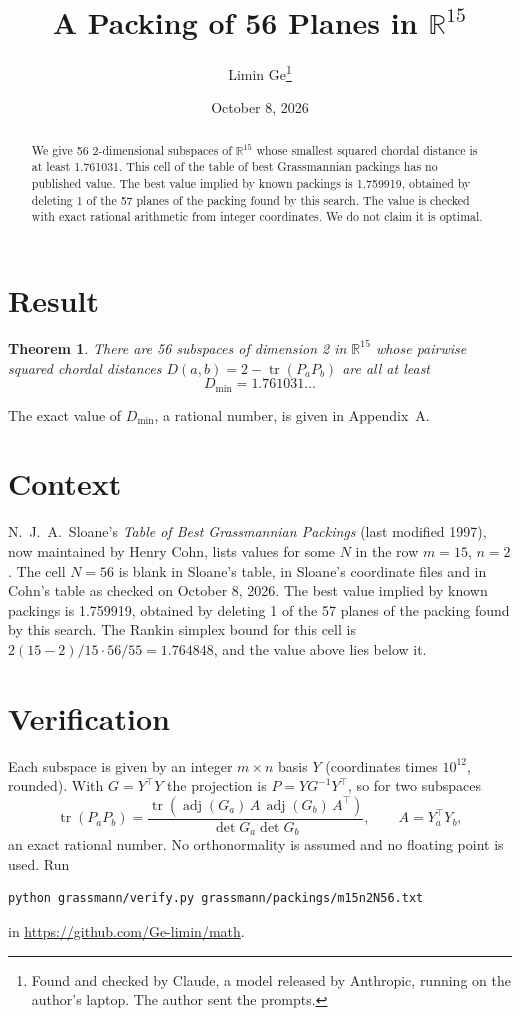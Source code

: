 \documentclass[11pt,a4paper]{article}
\title{A Packing of 56 Planes in $\mathbb{R}^{15}$}
\author{Limin Ge\thanks{Found and checked by Claude, a model released by Anthropic, running on the author's laptop. The author sent the prompts.}}
\date{October 8, 2026}
\newtheorem*{theorem}{Theorem}
\begin{document}
\maketitle
\begin{abstract}
We give 56 2-dimensional subspaces of $\mathbb{R}^{15}$ whose smallest squared chordal distance is at least 1.761031. This cell of the table of best Grassmannian packings has no published value. The best value implied by known packings is 1.759919, obtained by deleting 1 of the 57 planes of the packing found by this search. The value is checked with exact rational arithmetic from integer coordinates. We do not claim it is optimal.
\end{abstract}

\section{Result}
\begin{theorem}
There are 56 subspaces of dimension 2 in $\mathbb{R}^{15}$ whose pairwise squared chordal distances $D(a,b) = 2 - \operatorname{tr}(P_aP_b)$ are all at least
\[ D_{\min} = 1.761031\ldots \]
\end{theorem}
The exact value of $D_{\min}$, a rational number, is given in Appendix~A.


\section{Context}
N.~J.~A.~Sloane's \emph{Table of Best Grassmannian Packings} (last modified 1997), now maintained by Henry Cohn, lists values for some $N$ in the row $m=15$, $n=2$. The cell $N=56$ is blank in Sloane's table, in Sloane's coordinate files and in Cohn's table as checked on October 8, 2026. The best value implied by known packings is 1.759919, obtained by deleting 1 of the 57 planes of the packing found by this search. The Rankin simplex bound for this cell is $2(15-2)/15\cdot 56/55 = 1.764848$, and the value above lies below it.


\section{Verification}
Each subspace is given by an integer $m\times n$ basis $Y$ (coordinates times $10^{12}$, rounded). With $G=Y^\top Y$ the projection is $P=YG^{-1}Y^\top$, so for two subspaces
\[ \operatorname{tr}(P_aP_b)=\frac{\operatorname{tr}(\operatorname{adj}(G_a)\,A\,\operatorname{adj}(G_b)\,A^\top)}{\det G_a\det G_b},\qquad A=Y_a^\top Y_b, \]
an exact rational number. No orthonormality is assumed and no floating point is used. Run
\begin{verbatim}
python grassmann/verify.py grassmann/packings/m15n2N56.txt
\end{verbatim}
in \url{https://github.com/Ge-limin/math}.
\end{document}

